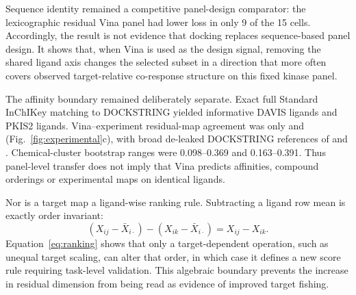 \documentclass[11pt]{article}
\begin{document}
Sequence identity remained a competitive panel-design comparator: the
lexicographic residual Vina panel had lower loss in only 9 of the 15 cells.
Accordingly, the result is not evidence that docking replaces sequence-based
panel design. It shows that, when Vina is used as the design signal, removing
the shared ligand axis changes the selected subset in a direction that more
often covers observed target-relative co-response structure on this fixed
kinase panel.

The affinity boundary remained deliberately separate. Exact full Standard
InChIKey matching to DOCKSTRING yielded \DavisSameSupportLigands{} informative
DAVIS ligands and \PkistwoSameSupportLigands{} PKIS2 ligands. Vina--experiment
residual-map agreement was only \DavisSameSupportRho{} and
\PkistwoSameSupportRho{} (Fig.~\ref{fig:experimental}c), with broad de-leaked
DOCKSTRING references of \DavisBroadSupportRho{} and
\PkistwoBroadSupportRho{}. Chemical-cluster bootstrap ranges were 0.098--0.369
and 0.163--0.391. Thus panel-level transfer does not imply that Vina predicts
affinities, compound orderings or experimental maps on identical ligands.

Nor is a target map a ligand-wise ranking rule. Subtracting a ligand row mean is
exactly order invariant:
\begin{equation}
(X_{ij}-\bar X_{i\cdot})-(X_{ik}-\bar X_{i\cdot})=X_{ij}-X_{ik}.
\label{eq:ranking}
\end{equation}
Equation~\ref{eq:ranking} shows that only a target-dependent operation, such as unequal target scaling, can alter
that order, in which case it defines a new score rule requiring task-level
validation. This algebraic boundary prevents the increase in residual dimension
from being read as evidence of improved target fishing.
\end{document}
